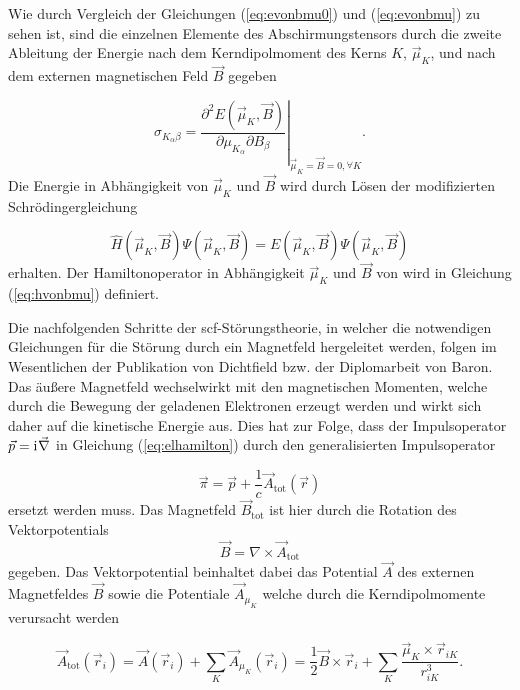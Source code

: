 	  Wie durch Vergleich der Gleichungen (\ref{eq:evonbmu0}) und (\ref{eq:evonbmu}) zu sehen ist, sind die einzelnen Elemente des Abschirmungstensors durch die zweite Ableitung der Energie nach dem Kerndipolmoment des Kerns $K$, $\vec{\mu}_K$, und nach dem externen magnetischen Feld $\vec{B}$ gegeben
	
	\begin{equation}\label{eq:abschirmugstensor}
	\sigma_{K_\alpha\beta}=\left.\frac{\partial^2 E(\vec{\mu}_K,\vec{B})}{\partial \mu_{K_\alpha}\partial B_\beta}\right|_{\vec{\mu}_K=\vec{B}=0,\forall K}.
	\end{equation}
	Die Energie in Abhängigkeit von $\vec{\mu}_K$ und $\vec{B}$ wird durch Lösen der modifizierten Schrödingergleichung
	
	\begin{equation}
	\hat{H}(\vec{\mu}_K,\vec{B})\Psi(\vec{\mu}_K,\vec{B})=E(\vec{\mu}_K,\vec{B})\Psi(\vec{\mu}_K,\vec{B})
	\end{equation}
	erhalten. Der Hamiltonoperator in Abhängigkeit $\vec{\mu}_K$ und $\vec{B}$ von wird in Gleichung (\ref{eq:hvonbmu}) definiert. 
	 

	\bigskip
	Die nachfolgenden Schritte der \ac{scf}-Störungstheorie, in welcher die notwendigen Gleichungen für die Störung durch ein Magnetfeld hergeleitet werden, folgen im Wesentlichen der Publikation von Dichtfield\supercite{ditchfield1974self} bzw. der Diplomarbeit von Baron\supercite{baron1991}. Das äußere Magnetfeld wechselwirkt mit den magnetischen Momenten, welche durch die Bewegung der geladenen Elektronen erzeugt werden und wirkt sich daher auf die kinetische Energie aus. Dies hat zur Folge, dass der Impulsoperator $\vec{p}=\mathrm{i}\mkern1mu\vec{\nabla}$ in Gleichung (\ref{eq:elhamilton}) durch den generalisierten Impulsoperator
	
	\begin{equation}
	\vec{\pi}=\vec{p}+\frac{1}{c}\vec{A}_{\textrm{tot}}(\vec{r})
	\end{equation}
	ersetzt werden muss. Das Magnetfeld $\vec{B}_{\textrm{tot}}$ ist hier durch die Rotation des Vektorpotentials
	\begin{equation}
	\vec{B}=\nabla \times \vec{A}_{\textrm{tot}}
	\end{equation}
	gegeben. Das Vektorpotential beinhaltet dabei das Potential $\vec{A}$ des externen Magnetfeldes $\vec{B}$ sowie die Potentiale $\vec{A}_{\mu_K}$ welche durch die Kerndipolmomente verursacht werden	 
	
	\begin{equation}\label{eq:atot}
	 \vec{A}_{\textrm{tot}}(\vec{r}_i)=\vec{A}(\vec{r}_i)+\sum_K\vec{A}_{\mu_K}(\vec{r}_i)=\frac{1}{2}\vec{B}\times \vec{r}_i +\sum_K\frac{\vec{\mu}_K\times\vec{r}_{iK}}{r_{iK}^3}.
	\end{equation}
	
